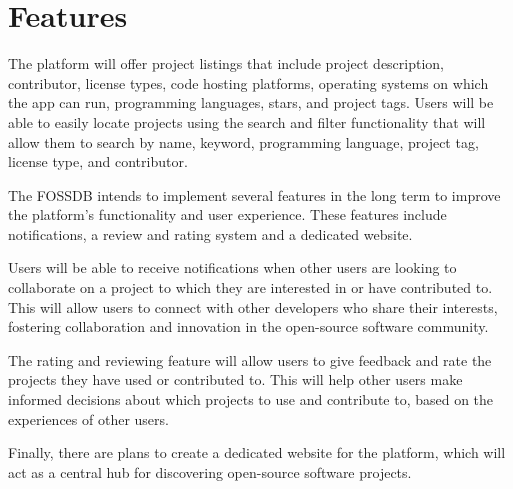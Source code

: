 \pagebreak
\section{Features}
The platform will offer project listings that include project description, contributor,
license types, code hosting platforms, operating systems on which the app can run,
programming languages, stars, and project tags.
Users will be able to easily locate projects using the search and filter functionality that will allow them
to search by name, keyword, programming language, project tag, license type, and contributor.

The FOSSDB intends to implement several features in the long term to improve the platform's
functionality and user experience.
These features include notifications, a review and rating system and a dedicated website. 

Users will be able to receive notifications when other users are looking to collaborate
on a project to which they are interested in or have contributed to.
This will allow users to connect with other developers who share their interests,
fostering collaboration and innovation in the open-source software community. 

The rating and reviewing feature will allow users to give feedback and rate the
projects they have used or contributed to.
This will help other users make informed decisions about which projects
to use and contribute to, based on the experiences of other users. 

Finally, there are plans to create a dedicated website for the platform,
which will act as a central hub for discovering open-source software projects. 
